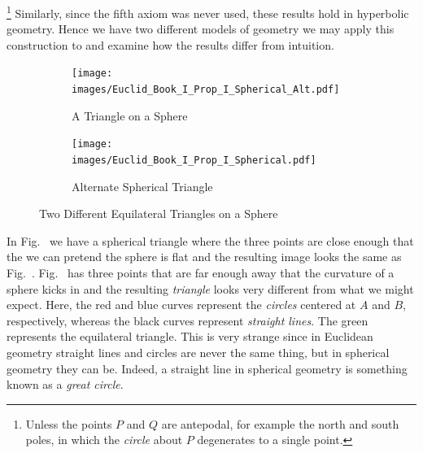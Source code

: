        \footnote{%
            Unless the points $P$ and $Q$ are antepodal, for example the north
            and south poles, in which the \textit{circle} about $P$ degenerates
            to a single point.
        }
        Similarly, since the fifth axiom was never used, these results hold in
        hyperbolic geometry. Hence we have two different models of geometry we
        may apply this construction to and examine how the results differ from
        intuition.
        \begin{figure}[H]
            \centering
            \begin{subfigure}[b]{0.49\textwidth}
                \centering
                \captionsetup{type=figure}
                \texttt{[image: images/Euclid\_Book\_I\_Prop\_I\_Spherical\_Alt.pdf]}
                \caption{A Triangle on a Sphere}
                \label{fig:Euclid_Book_I_Prop_I_Spherical_Alt}
            \end{subfigure}
            \begin{subfigure}[b]{0.49\textwidth}
                \centering
                \captionsetup{type=figure}
                \texttt{[image: images/Euclid\_Book\_I\_Prop\_I\_Spherical.pdf]}
                \caption{Alternate Spherical Triangle}
                \label{fig:Euclid_Book_I_Prop_I_Spherical}
            \end{subfigure}
            \caption{Two Different Equilateral Triangles on a Sphere}
        \end{figure}
        In Fig.~ we have a
        spherical triangle where the three points are close enough that the we
        can pretend the sphere is flat and the resulting image looks the same as
        Fig.~.
        Fig.~ has three points that
        are far enough away that the curvature of a sphere kicks in and the
        resulting \textit{triangle} looks very different from what we might
        expect. Here, the red and blue curves represent the \textit{circles}
        centered at $A$ and $B$, respectively, whereas the black curves
        represent \textit{straight lines}. The green represents the equilateral
        triangle. This is very strange since in Euclidean geometry straight
        lines and circles are never the same thing, but in spherical geometry
        they can be. Indeed, a straight line in spherical geometry is something
        known as a \textit{great circle}.
        \par\hfill\par
